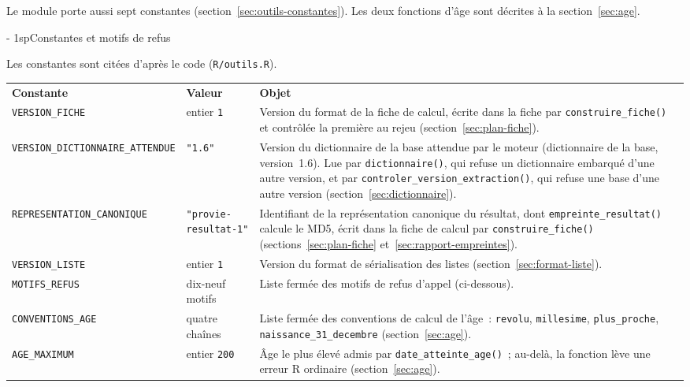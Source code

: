 \documentclass[a4paper,11pt]{article}
\makeatletter
\newcommand{\titrebandeau}[1]{%
  \noindent{\color{financeblue}\rule{\linewidth}{2.5pt}}
  \par\vspace{5mm}
  {\color{greenline}\raggedright\fontsize{19}{23}\bfseries\selectfont #1\par}
  \vspace{6mm}}
\newcommand{\charte@bandeau}[1]{%
  \parindent\z@ \everypar{\strut}%
  {\strut\par}\nobreak
  \titrebandeau{#1}\nobreak
  \kern\z@\nobreak\strut\par}
\newcommand{\charte@reserve}[1]{\par\ifinner\else\if@nobreak\else
  \penalty\z@ %
  \begingroup\setlength{\dimen@}{#1}%
  \dimen@ii\pagegoal \advance\dimen@ii-\pagetotal
  \ifdim\pagegoal=\maxdimen\else\ifdim\dimen@>\dimen@ii
    \vfil\penalty-\@M %
  \fi\fi\endgroup\fi\fi}
\renewcommand{\section}{\charte@reserve{12\baselineskip}%
  \@startsection{section}{1}{\z@}%
  {\z@}{1sp}{\normalfont\charte@bandeau}}
\newcommand{\code}[1]{\texttt{\small #1}}
\makeatother
\begin{document}
Le module porte aussi sept constantes (section~\ref{sec:outils-constantes}).
Les deux fonctions d'âge sont décrites à la section~\ref{sec:age}.

\section{Constantes et motifs de refus}
\label{sec:outils-constantes}

Les constantes sont citées d'après le code (\code{R/outils.R}).

\begin{center}
\small
{}
\begin{tabular}{@{}p{5.6cm}p{3.7cm}p{5.8cm}@{}}
\rowcolor{tableheader}
\textcolor{financeblue}{\textbf{Constante}} & \textcolor{financeblue}{\textbf{Valeur}} & \textcolor{financeblue}{\textbf{Objet}} \\
\code{VERSION\_FICHE} & entier \code{1} & Version du format de la fiche de calcul, écrite dans la fiche par \code{construire\_fiche()} et contrôlée la première au rejeu (section~\ref{sec:plan-fiche}). \\
\code{VERSION\_DICTIONNAIRE\_ATTENDUE} & \code{"1.6"} & Version du dictionnaire de la base attendue par le moteur (dictionnaire de la base, version~1.6). Lue par \code{dictionnaire()}, qui refuse un dictionnaire embarqué d'une autre version, et par \code{controler\_version\_extraction()}, qui refuse une base d'une autre version (section~\ref{sec:dictionnaire}). \\
\code{REPRESENTATION\_CANONIQUE} & \code{"provie-resultat-1"} & Identifiant de la représentation canonique du résultat, dont \code{empreinte\_resultat()} calcule le MD5, écrit dans la fiche de calcul par \code{construire\_fiche()} (sections~\ref{sec:plan-fiche} et~\ref{sec:rapport-empreintes}). \\
\code{VERSION\_LISTE} & entier \code{1} & Version du format de sérialisation des listes (section~\ref{sec:format-liste}). \\
\code{MOTIFS\_REFUS} & dix-neuf motifs & Liste fermée des motifs de refus d'appel (ci-dessous). \\
\code{CONVENTIONS\_AGE} & quatre chaînes & Liste fermée des conventions de calcul de l'âge~: \code{revolu}, \code{millesime}, \code{plus\_proche}, \code{naissance\_31\_decembre} (section~\ref{sec:age}). \\
\code{AGE\_MAXIMUM} & entier \code{200} & Âge le plus élevé admis par \code{date\_atteinte\_age()}~; au-delà, la fonction lève une erreur R ordinaire (section~\ref{sec:age}). \\
\end{tabular}
\end{center}
\end{document}
